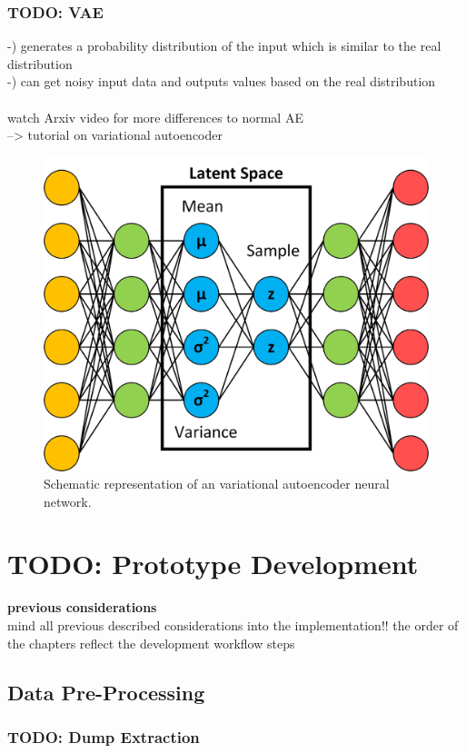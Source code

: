 \documentclass[MGS,Master,english]{twbook}%
\begin{document}
\subsection{TODO: \acl{VAE}}
-) generates a probability distribution of the input which is similar to the real distribution\\
-) can get noisy input data and outputs values based on the real distribution\\
\\
watch Arxiv video for more differences to normal AE\\
--> tutorial on variational autoencoder

\begin{figure}[!htbp]
	\centering
	\includegraphics[width=0.7\linewidth]{PICs/NNs/variational_autoencoder}
	\caption{Schematic representation of an variational autoencoder neural network.}
\end{figure}
%
%
\clearpage
\chapter{TODO: Prototype Development}
\textbf{previous considerations}\\
mind all previous described considerations into the implementation!! 
the order of the chapters reflect the development workflow steps 
\section{Data Pre-Processing}
\subsection{TODO: Dump Extraction}
\end{document}
